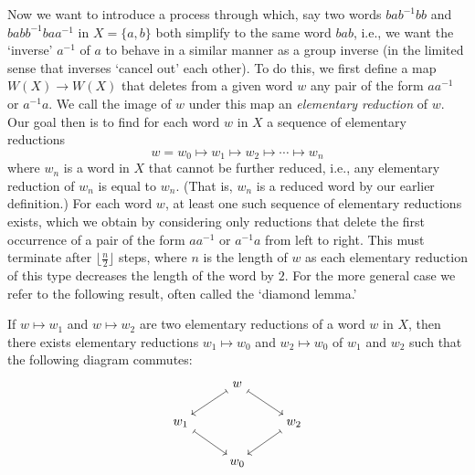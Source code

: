Now we want to introduce a process through which, say two words \(bab^{-1}bb\)
and \(babb^{-1}baa^{-1}\) in \(X = \{a, b\}\) both simplify to the same word
\(bab\), i.e., we want the `inverse' \(a^{-1}\) of \(a\) to behave in a similar
manner as a group inverse (in the limited sense that inverses `cancel out' each
other). To do this, we first define a map \(W(X) \to W(X)\) that deletes from a
given word \(w\) any pair of the form \(aa^{-1}\) or \(a^{-1}a\). We call the
image of \(w\) under this map an \emph{elementary reduction} of \(w\). Our goal
then is to find for each word \(w\) in \(X\) a sequence of elementary reductions
\[
    w = w_0 \mapsto w_1 \mapsto w_2 \mapsto \cdots \mapsto w_n
\]
where \(w_n\) is a word in \(X\) that cannot be further reduced, i.e., any
elementary reduction of \(w_n\) is equal to \(w_n\). (That is, \(w_n\) is a
reduced word by our earlier definition.) For each word \(w\), at least one such
sequence of elementary reductions exists, which we obtain by considering only
reductions that delete the first occurrence of a pair of the form \(aa^{-1}\) or
\(a^{-1}a\) from left to right. This must terminate after \(\lfloor \frac{n}{2}
\rfloor\) steps, where \(n\) is the length of \(w\) as each elementary reduction
of this type decreases the length of the word by \(2\). For the more general
case we refer to the following result, often called the `diamond lemma.'

\begin{lemma}
    If \(w \mapsto w_1\) and \(w \mapsto w_2\) are two elementary reductions of
    a word \(w\) in \(X\), then there exists elementary reductions \(w_1 \mapsto
    w_0\) and \(w_2 \mapsto w_0\) of \(w_1\) and \(w_2\) such that the following
    diagram commutes:
    \[
        \begin{tikzcd}
            & w \arrow[ld, maps to] \arrow[rd, maps to] &                \\
            w_1 \arrow[rd, maps to] &                         & w_2 \arrow[ld, maps to] \\
                        & w_0                     &               
        \end{tikzcd}
    \]
\end{lemma}


